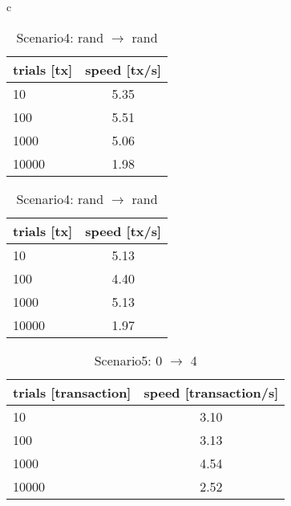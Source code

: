 \documentclass[a4j,11pt,uplatex,onecolumn]{article}
\begin{document}
\begin{table}[htbp]
    \begin{center}
        \begin{tabular}{c}

            \begin{minipage}{0.5\hsize}
                \begin{center}
                    \caption{Scenario3: 0 $\rightleftarrows$ 1, 2 $\rightleftarrows$ 3}
                    \begin{tabular}{|l|c|} \hline
                        trials [tx] & speed [tx/s]\\ \hline \hline
                        10 & 5.35 \\
                        100 & 5.51 \\
                        1000 & 5.06 \\
                        10000 & 1.98 \\ \hline
                    \end{tabular}
                \end{center}
            \end{minipage}

            \begin{minipage}{0.5\hsize}
                \begin{center}
                    \caption{Scenario4: rand $\rightarrow$ rand}
                    \begin{tabular}{|l|c|} \hline
                        trials [tx] & speed [tx/s]\\ \hline \hline
                        10 & 5.13 \\
                        100 & 4.40 \\
                        1000 & 5.13 \\
                        10000 & 1.97  \\ \hline
                    \end{tabular}
                \end{center}
            \end{minipage}

        \end{tabular}
    \end{center}
\end{table}

\begin{table}[htb]
  \begin{center}
    \caption{Scenario5: 0 $\rightarrow$ 4}
    \begin{tabular}{|l|c|} \hline
        trials [transaction] & speed [transaction/s]\\ \hline \hline
        10 & 3.10 \\
        100 & 3.13 \\
        1000 & 4.54 \\
        10000 & 2.52 \\ \hline
    \end{tabular}
  \end{center}
\end{table}
\end{document}
